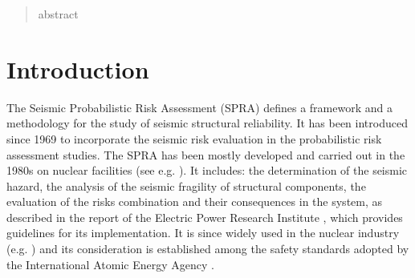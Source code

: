 

\begin{abstract}
    abstract
\end{abstract}

\minitoc


\section{Introduction}


The Seismic Probabilistic Risk Assessment (SPRA) defines a framework and a methodology for the study of seismic structural reliability. %
It has been introduced since 1969 \citep{cornell_engineering_1968}
to incorporate the seismic risk evaluation in the probabilistic risk assessment studies.
The SPRA has been mostly developed and carried out in the 1980s on nuclear facilities (see e.g. \cite{kennedy_probabilistic_1980,kennedy_seismic_1984}). 
It includes: the determination of the seismic hazard, the analysis of the seismic fragility of structural components, the evaluation of the risks combination and their consequences in the system, as described in the report of the Electric Power Research Institute \citep{epri_seismic_2013}, which provides guidelines for its implementation. %
It is since widely used in the nuclear industry (e.g. \cite{ellingwood_validation_1990,park_survey_1998,kennedy_risk_1999}) and its consideration is established among the safety standards adopted by the International Atomic Energy Agency \citep{iaea_probabilistic_2020}.


